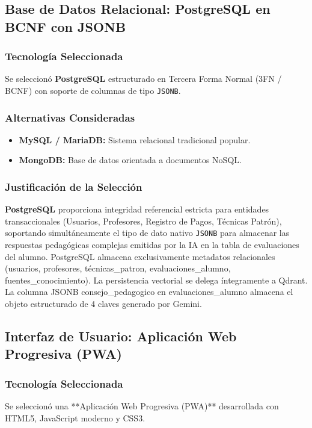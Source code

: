 \subsection{Base de Datos Relacional: PostgreSQL en BCNF con JSONB}

\subsubsection{Tecnología Seleccionada}
Se seleccionó \textbf{PostgreSQL} estructurado en Tercera Forma Normal (3FN / BCNF) con soporte de columnas de tipo \texttt{JSONB}.

\subsubsection{Alternativas Consideradas}
\begin{itemize}
    \item \textbf{MySQL / MariaDB:} Sistema relacional tradicional popular.
    \item \textbf{MongoDB:} Base de datos orientada a documentos NoSQL.
\end{itemize}

\subsubsection{Justificación de la Selección}
\textbf{PostgreSQL} proporciona integridad referencial estricta para entidades transaccionales (Usuarios, Profesores, Registro de Pagos, Técnicas Patrón), soportando simultáneamente el tipo de dato nativo \texttt{JSONB} para almacenar las respuestas pedagógicas complejas emitidas por la IA en la tabla de evaluaciones del alumno. PostgreSQL almacena exclusivamente metadatos relacionales (usuarios, profesores, técnicas\_patron, evaluaciones\_alumno, fuentes\_conocimiento). La persistencia vectorial se delega íntegramente a Qdrant. La columna JSONB consejo\_pedagogico en evaluaciones\_alumno almacena el objeto estructurado de 4 claves generado por Gemini.

\subsection{Interfaz de Usuario: Aplicación Web Progresiva (PWA)}

\subsubsection{Tecnología Seleccionada}
Se seleccionó una **Aplicación Web Progresiva (PWA)** desarrollada con HTML5, JavaScript moderno y CSS3.

